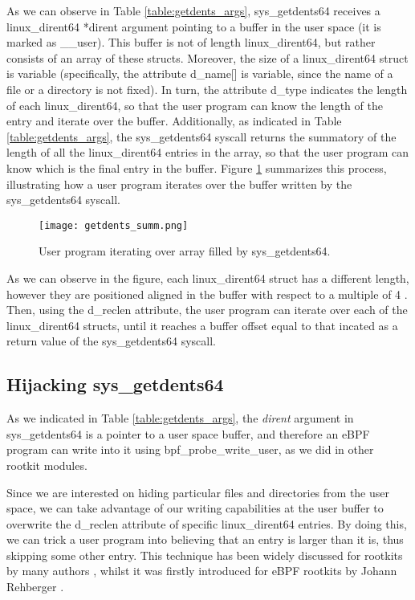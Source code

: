 As we can observe in Table \ref{table:getdents_args}, sys\_getdents64 receives a linux\_dirent64 *dirent argument pointing to a buffer in the user space (it is marked as \_\_user). This buffer is not of length linux\_dirent64, but rather consists of an array of these structs. Moreover, the size of a linux\_dirent64 struct is variable (specifically, the attribute d\_name[] is variable, since the name of a file or a directory is not fixed). In turn, the attribute d\_type indicates the length of each linux\_dirent64, so that the user program can know the length of the entry and iterate over the buffer. Additionally, as indicated in Table \ref{table:getdents_args}, the sys\_getdents64 syscall returns the summatory of the length of all the linux\_dirent64 entries in the array, so that the user program can know which is the final entry in the buffer. Figure \ref{fig:getdents_summ} summarizes this process, illustrating how a user program iterates over the buffer written by the sys\_getdents64 syscall.

\begin{figure}[htbp]
	\centering
	\texttt{[image: getdents\_summ.png]}
	\caption{User program iterating over array filled by sys\_getdents64.}
	\label{fig:getdents_summ}
\end{figure}

As we can observe in the figure, each linux\_dirent64 struct has a different length, however they are positioned aligned in the buffer with respect to a multiple of 4 \cite{code_kerel_getdents_buffer_alignation}. Then, using the d\_reclen attribute, the user program can iterate over each of the linux\_dirent64 structs, until it reaches a buffer offset equal to that incated as a return value of the sys\_getdents64 syscall.

\subsection{Hijacking sys\_getdents64}
As we indicated in Table \ref{table:getdents_args}, the \textit{dirent} argument in sys\_getdents64 is a pointer to a user space buffer, and therefore an eBPF program can write into it using bpf\_probe\_write\_user, as we did in other rootkit modules. 

Since we are interested on hiding particular files and directories from the user space, we can take advantage of our writing capabilities at the user buffer to overwrite the d\_reclen attribute of specific linux\_dirent64 entries. By doing this, we can trick a user program into believing that an entry is larger than it is, thus skipping some other entry. This technique has been widely discussed for rootkits by many authors \cite{xcellerator_getdents}, whilst it was firstly introduced for eBPF rootkits by Johann Rehberger \cite{embracethered_getdents}. 

